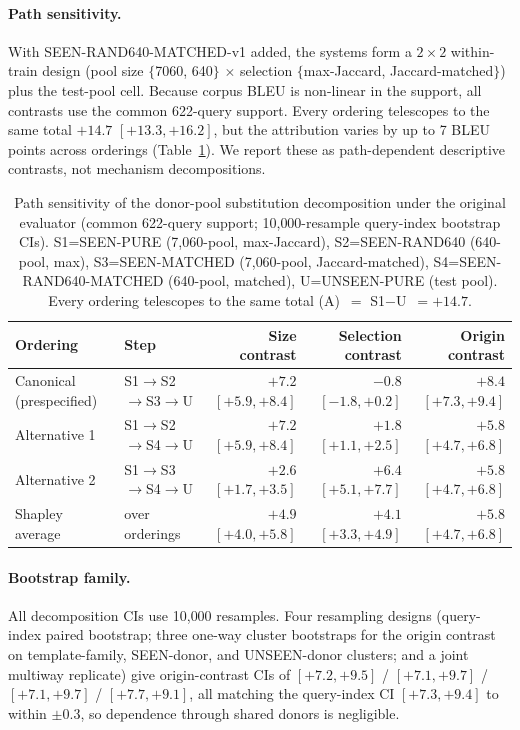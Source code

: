 \documentclass[pdflatex,sn-chicago]{sn-jnl}
\begin{document}
\paragraph{Path sensitivity.}
With SEEN-RAND640-MATCHED-v1 added, the systems form a $2\times2$ within-train design (pool size $\{$7060, 640$\}$ $\times$ selection $\{$max-Jaccard, Jaccard-matched$\}$) plus the test-pool cell. Because corpus BLEU is non-linear in the support, all contrasts use the common 622-query support. Every ordering telescopes to the same total $+14.7$ $[+13.3,+16.2]$, but the attribution varies by up to 7 BLEU points across orderings (Table~\ref{tab:path_sensitivity}). We report these as path-dependent descriptive contrasts, not mechanism decompositions.

\begin{table}[h]
\centering
\scriptsize
\caption{Path sensitivity of the donor-pool substitution decomposition under the original evaluator (common 622-query support; 10{,}000-resample query-index bootstrap CIs). S1=SEEN-PURE (7{,}060-pool, max-Jaccard), S2=SEEN-RAND640 (640-pool, max), S3=SEEN-MATCHED (7{,}060-pool, Jaccard-matched), S4=SEEN-RAND640-MATCHED (640-pool, matched), U=UNSEEN-PURE (test pool). Every ordering telescopes to the same total (A)~$=$ S1$-$U~$=+14.7$.}
\label{tab:path_sensitivity}
\begin{tabular}{llrrr}
\toprule
Ordering & Step & Size contrast & Selection contrast & Origin contrast \\
\midrule
Canonical (prespecified) & S1$\to$S2$\to$S3$\to$U & $+7.2$ $[+5.9,+8.4]$ & $-0.8$ $[-1.8,+0.2]$ & $+8.4$ $[+7.3,+9.4]$ \\
Alternative 1 & S1$\to$S2$\to$S4$\to$U & $+7.2$ $[+5.9,+8.4]$ & $+1.8$ $[+1.1,+2.5]$ & $+5.8$ $[+4.7,+6.8]$ \\
Alternative 2 & S1$\to$S3$\to$S4$\to$U & $+2.6$ $[+1.7,+3.5]$ & $+6.4$ $[+5.1,+7.7]$ & $+5.8$ $[+4.7,+6.8]$ \\
\midrule
Shapley average & over orderings & $+4.9$ $[+4.0,+5.8]$ & $+4.1$ $[+3.3,+4.9]$ & $+5.8$ $[+4.7,+6.8]$ \\
\bottomrule
\end{tabular}
\end{table}

\paragraph{Bootstrap family.}
All decomposition CIs use 10{,}000 resamples. Four resampling designs (query-index paired bootstrap; three one-way cluster bootstraps for the origin contrast on template-family, SEEN-donor, and UNSEEN-donor clusters; and a joint multiway replicate) give origin-contrast CIs of $[+7.2,+9.5]$ / $[+7.1,+9.7]$ / $[+7.1,+9.7]$ / $[+7.7,+9.1]$, all matching the query-index CI $[+7.3,+9.4]$ to within $\pm0.3$, so dependence through shared donors is negligible.
\end{document}
